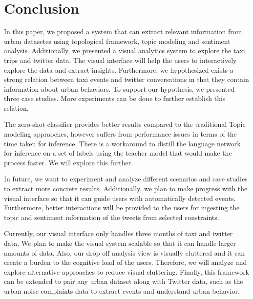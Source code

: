 \section{Conclusion}
In this paper, we proposed a system that can extract relevant information from urban datasetes using topological framework, topic modeling and sentiment analysis. Additionally, we presented a visual analytics system to explore the taxi trips and twitter data. The visual interface will help the users to interactively explore the data and extract insights. Furthermore, we hypothesized exists a strong relation between taxi events and twitter conversations in that they contain information about urban behaviors. To support our hypothesis, we presented three case studies. More experiments can be done to further establish this relation. 

The zero-shot classifier provides better results compared to the traditional Topic modeling appraoches, however suffers from performance issues in terms of the time taken for inference. There is a workaround to distill the language network for inference on a set of labels using the teacher model that would make the process faster. We will explore this further.

In future, we want to experiment and analyze different scenarios and case studies to extract more concrete results. Additionally, we plan to make progress with the visual interface so that it can guide users with automatically detected events. Furthermore, better interactions will be provided to the users for ingesting the topic  and sentiment information of the tweets from selected constraints. 

Currently, our visual interface only handles three months of taxi and twitter data. We plan to make the visual system scalable so that it can handle larger amounts of data. Also, our drop off analysis view is visually cluttered and it can create a burden to the cognitive load of the users. Therefore, we will analyze and explore alternative approaches to reduce visual cluttering. Finally, this framework can be extended to pair any urban dataset along with Twitter data, such as the urban noise complaints data to extract events and understand urban behavior.
